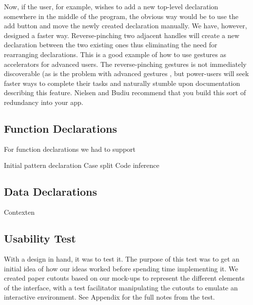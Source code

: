 Now, if the user, for example, wishes to add a new top-level declaration somewhere in the middle of the program, the obvious way would be to use the add button and move the newly created declaration manually. We have, however, designed a faster way. Reverse-pinching two adjacent handles will create a new
declaration between the two existing ones thus eliminating the  need for rearranging declarations. This is a good example of how to use gestures as accelerators for advanced users.
The reverse-pinching gestures is not immediately discoverable (as is the
problem with advanced gestures \cite[p 141]{nielsen2013mobile}, but power-users will seek faster
ways to complete their tasks and naturally stumble upon documentation
describing this feature. Nielsen and Budiu \cite[p 143]{nielsen2013mobile} recommend
that you build this sort of redundancy into your app.

\subsection{Function Declarations}
For function declarations we had to support 

Initial pattern declaration
Case split
Code inference


\subsection{Data Declarations}


Contexten




\subsection{Usability Test}
\label{sec:UsabilityTest}
With a design in hand, it was to test it. The purpose of this test was to get
an initial idea of how our ideas worked before spending time implementing it.
We created paper cutouts based on our mock-ups to represent the different
elements of the interface, with a test facilitator manipulating the cutouts to
emulate an interactive environment. See Appendix  for the full notes
from the test.

